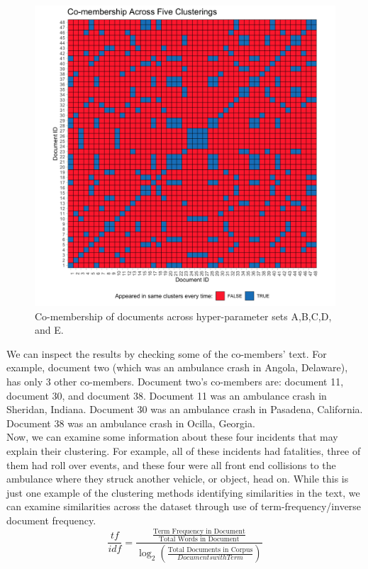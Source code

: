 \begin{figure}
\includegraphics[width=6in]{Content/Images/comembers5.png}
\caption{Co-membership of documents across hyper-parameter sets A,B,C,D, and E.}
\end{figure}

We can inspect the results by checking some of the co-members' text. For example, document two (which was an ambulance crash in Angola, Delaware), has only 3 other co-members. Document two's co-members are: document 11, document 30, and document 38. Document 11 was an ambulance crash in Sheridan, Indiana. Document 30 was an ambulance crash in Pasadena, California. Document 38 was an ambulance crash in Ocilla, Georgia.\\
Now, we can examine some information about these four incidents that may explain their clustering. For example, all of these incidents had fatalities, three of them had roll over events, and these four were all front end collisions to the ambulance where they struck another vehicle, or object, head on. While this is just one example of the clustering methods identifying similarities in the text, we can examine similarities across the dataset through use of term-frequency/inverse document frequency.\\

\begin{equation}
\frac{tf}{idf} = \frac{\frac{\text{Term Frequency in Document}}{\text{Total Words in Document}}}{\log_2(\frac{\text{Total Documents in Corpus}}{Documents with Term})}
\end{equation}

